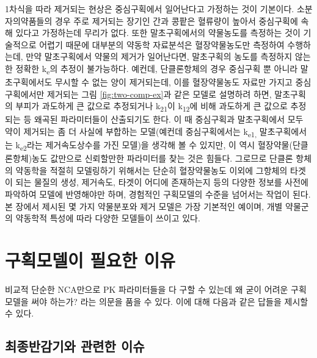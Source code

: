 \documentclass[
  11pt,
  krantz2, a4paper, twoside]{krantz}
\theoremstyle{definition}
\theoremstyle{definition}
\theoremstyle{definition}
\theoremstyle{definition}
\theoremstyle{remark}
\begin{document}
1차식을 따라 제거되는 현상은 중심구획에서 일어난다고 가정하는 것이
기본이다. 소분자의약품들의 경우 주로 제거되는 장기인 간과 콩팥은
혈류량이 높아서 중심구획에 속해 있다고 가정하는데 무리가 없다. 또한
말초구획에서의 약물농도를 측정하는 것이 기술적으로 어렵기 때문에
대부분의 약동학 자료분석은 혈장약물농도만 측정하여 수행하는데, 만약
말초구획에서 약물의 제거가 일어난다면, 말초구획의 농도를 측정하지 않는
한 정확한 k\textsubscript{e}의 추정이 불가능하다. 예컨데, 단클론항체의 경우 중심구획
뿐 아니라 말초구획에서도 무시할 수 없는 양이 제거되는데, 이를
혈장약물농도 자료만 가지고 중심구획에서만 제거되는 그림 \ref{fig:two-comp-ex}과 같은
모델로 설명하려 하면, 말초구획의 부피가 과도하게 큰 값으로 추정되거나
k\textsubscript{21}이 k\textsubscript{12}에 비해 과도하게 큰 값으로 추정되는 등 왜곡된 파라미터들이
산출되기도 한다. 이 때 중심구획과 말초구획에서 모두 약이 제거되는 좀 더
사실에 부합하는 모델(예컨데 중심구획에서는 k\textsubscript{e1,} 말초구획에서는
k\textsubscript{e2}라는 제거속도상수를 가진 모델)을 생각해 볼 수 있지만, 이 역시 혈장약물(단클론항체)농도 값만으로 신뢰할만한 파라미터를 찾는 것은 힘들다.
그로므로 단클론 항체의 약동학을 적절히 모델링하기 위해서는 단순히 혈장약물농도 이외에 그항체의 타겟이 되는 물질의 생성, 제거속도, 타겟이 어디에 존재하는지 등의 다양한 정보를 사전에 파악하여 모델에 반영해야만 하며, 경험적인 구획모델의 수준을 넘어서는 작업이 된다.
본 장에서 제시된 몇 가지 약물분포와 제거 모델은 가장 기본적인 예이며, 개별 약물군의 약동학적 특성에 따라 다양한 모델들이 쓰이고 있다.

\section{구획모델이 필요한 이유}\label{uxad6cuxd68duxbaa8uxb378uxc774-uxd544uxc694uxd55c-uxc774uxc720}

비교적 단순한 NCA만으로 PK 파라미터들을 다 구할 수 있는데 왜 굳이 어려운 구획모델을 써야 하는가? 라는 의문을 품을 수 있다.
이에 대해 다음과 같은 답들을 제시할 수 있다.

\subsection{\texorpdfstring{최종반감기와 관련한 이슈}{최종반감기와 관련한 이슈}}\label{uxcd5cuxc885uxbc18uxac10uxae30uxc640-uxad00uxb828uxd55c-uxc774uxc288}
\end{document}
